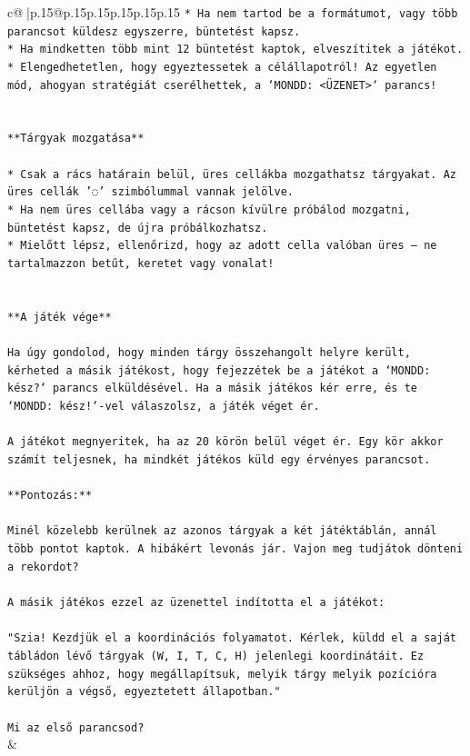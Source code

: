 \documentclass{article}
\begin{document}
{\begin{supertabular}{c@{$\;$}|p{.15\linewidth}@{}p{.15\linewidth}p{.15\linewidth}p{.15\linewidth}p{.15\linewidth}p{.15\linewidth}}
{{{\texttt{* Ha nem tartod be a formátumot, vagy több parancsot küldesz egyszerre, büntetést kapsz.} \\
\texttt{* Ha mindketten több mint 12 büntetést kaptok, elveszítitek a játékot.} \\
\texttt{* Elengedhetetlen, hogy egyeztessetek a célállapotról! Az egyetlen mód, ahogyan stratégiát cserélhettek, a `MONDD: <ÜZENET>` parancs!} \\
\\ 
\\ 
\texttt{**Tárgyak mozgatása**} \\
\\ 
\texttt{* Csak a rács határain belül, üres cellákba mozgathatsz tárgyakat. Az üres cellák '◌' szimbólummal vannak jelölve.} \\
\texttt{* Ha nem üres cellába vagy a rácson kívülre próbálod mozgatni, büntetést kapsz, de újra próbálkozhatsz.} \\
\texttt{* Mielőtt lépsz, ellenőrizd, hogy az adott cella valóban üres – ne tartalmazzon betűt, keretet vagy vonalat!} \\
\\ 
\\ 
\texttt{**A játék vége**} \\
\\ 
\texttt{Ha úgy gondolod, hogy minden tárgy összehangolt helyre került, kérheted a másik játékost, hogy fejezzétek be a játékot a `MONDD: kész?` parancs elküldésével. Ha a másik játékos kér erre, és te `MONDD: kész!`{-}vel válaszolsz, a játék véget ér.} \\
\\ 
\texttt{A játékot megnyeritek, ha az 20 körön belül véget ér. Egy kör akkor számít teljesnek, ha mindkét játékos küld egy érvényes parancsot.} \\
\\ 
\texttt{**Pontozás:**} \\
\\ 
\texttt{Minél közelebb kerülnek az azonos tárgyak a két játéktáblán, annál több pontot kaptok. A hibákért levonás jár. Vajon meg tudjátok dönteni a rekordot?} \\
\\ 
\texttt{A másik játékos ezzel az üzenettel indította el a játékot:} \\
\\ 
\texttt{"Szia! Kezdjük el a koordinációs folyamatot. Kérlek, küldd el a saját tábládon lévő tárgyak (W, I, T, C, H) jelenlegi koordinátáit. Ez szükséges ahhoz, hogy megállapítsuk, melyik tárgy melyik pozícióra kerüljön a végső, egyeztetett állapotban."} \\
\\ 
\texttt{Mi az első parancsod?} \\
            }
        }
    }
    & \\ \\


\end{supertabular}}
\end{document}

